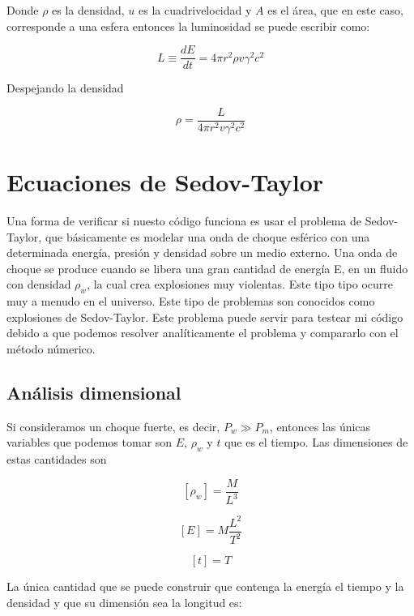 \documentclass[12pt,a4paper]{book}
\begin{document}
Donde $\rho$ es la densidad, $u$ es la cuadrivelocidad y $A$ es el área, que en este caso, corresponde a una esfera
entonces la luminosidad se puede escribir como:

\begin{equation}
  L \equiv \dfrac{d E}{d t} = 4\pi r^2 \rho v \gamma^2 c^2
\end{equation}

Despejando la densidad

\begin{equation}
  \rho = \frac{L}{4\pi r^2 v \gamma^2 c^2}
\end{equation}

\section{Ecuaciones de Sedov-Taylor}

Una forma de verificar si nuesto código funciona es usar el problema de Sedov-Taylor, que básicamente es modelar una onda de choque esférico con una determinada 
energía, presión y densidad sobre un medio externo. 
Una onda de choque se produce cuando se libera una gran cantidad de energía E, en un fluido con densidad $\rho_w$, la cual crea explosiones muy violentas. 
Este tipo tipo ocurre muy a menudo en el universo. Este tipo de problemas son conocidos como explosiones de Sedov-Taylor. Este problema puede servir para testear mi código debido a que podemos resolver analíticamente el problema y compararlo con el método númerico.

\subsection{Análisis dimensional}
Si consideramos un choque fuerte,
es decir, $P_w \gg P_m$,
entonces las únicas variables que podemos tomar son $E$, $\rho_w$ y $t$ que es el tiempo.
Las dimensiones de estas cantidades son 

\begin{equation}
  \left[ \rho_w \right] = \frac{M}{L^3}
\end{equation}

\begin{equation}
  \left[E\right] = M \frac{L^2}{T^2}
\end{equation}

\begin{equation}
  \left[ t\right] = T
\end{equation}

La única cantidad que se puede construir que contenga la energía el tiempo y la densidad y que su dimensión sea
la longitud es:
\end{document}
